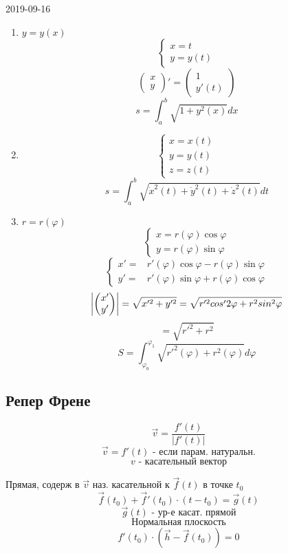 \documentclass[main]{subfiles}
\begin{document}
\begin{lect} {2019-09-16}
		\begin{examples}
				\begin{enumerate}
					\item $y = y(x)$
						\[\begin{cases}
								x = t\\
								y = y(t)
						\end{cases}\]
						\[\begin{pmatrix}
							x\\
							y
						\end{pmatrix}' = \begin{pmatrix}
							1\\
							y'(t)
						\end{pmatrix}\]
						\[s = \int_a^b \sqrt{1 + y^2(x)} dx\]
					\item \[\begin{cases}
								x = x(t)\\
								y = y(t)\\
								z = z(t)
							\end{cases}\]
							\[s = \int_a^b \sqrt{\dot{x}^2(t) + \dot{y}^2(t) + \dot{z}^2(t)}dt\]
						\item $r = r(\varphi)$
							\[\begin{cases}
									x = r(\varphi) \cos \varphi\\
									y = r(\varphi) \sin \varphi
							\end{cases}\]
							\[\begin{cases}
									x' = &r'(\varphi) \cos \varphi - r(\varphi)\sin \varphi\\
									y' = &r'(\varphi) \sin \varphi + r(\varphi)\cos \varphi
							\end{cases}\]
							\[\left|\begin{pmatrix}
								x'\\
								y'
							\end{pmatrix}\right| =
							\sqrt{x'^2 + y'^2} = \sqrt{r'^2 cos'2 \varphi + r^2 sin^2 \varphi }\]
							\[= \sqrt{r'^2 + r^2}\]
							\[S = \int_{\varphi_0}^{\varphi_1} \sqrt{r'^2(\varphi) + r^2(\varphi)}d\varphi  \]
				\end{enumerate}
		\end{examples}

	\subsection{Репер Френе}
		\begin{Definition}
			\[\vec{v} = \frac{f'(t)}{|f'(t)|}\]
			\[\vec{v} = f'(t) \text{ - если парам. натуральн.}\]
			\[v \text{ - касательный вектор}\]
		\end{Definition}

		\begin{definition}
			Прямая, содерж в $\vec{v}$ наз. касательной к $\vec{f}(t)$ в точке $t_0$
            \[\vec{f}(t_0) + \vec{f}'(t_0) \cdot (t - t_0) = \vec{g}(t)\]
			\[\vec{g}(t) \text{ - ур-е касат. прямой}\]
			\[\text{Нормальная плоскость}\]
			\[f'(t_0) \cdot (\vec{h} - \vec{f}(t_0)) = 0\]
		\end{definition}
	\end{lect}
\end{document}
